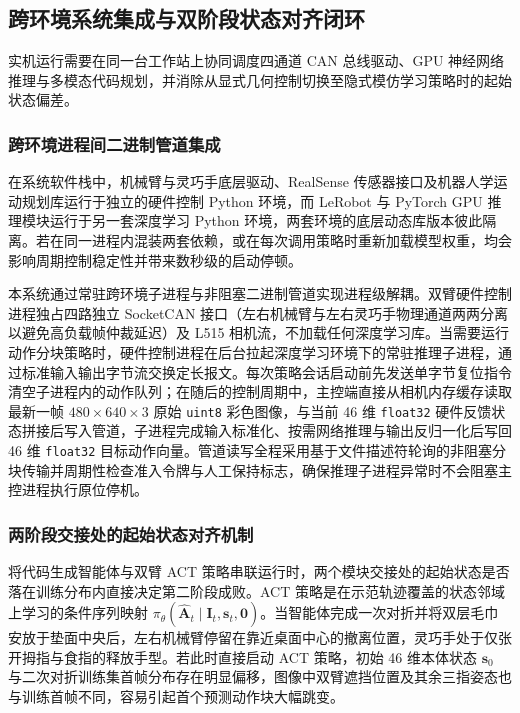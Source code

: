 \subsection{跨环境系统集成与双阶段状态对齐闭环}
\label{subsec:integration}

实机运行需要在同一台工作站上协同调度四通道 CAN 总线驱动、GPU 神经网络推理与多模态代码规划，并消除从显式几何控制切换至隐式模仿学习策略时的起始状态偏差。

\subsubsection{跨环境进程间二进制管道集成}

在系统软件栈中，机械臂与灵巧手底层驱动、RealSense 传感器接口及机器人学运动规划库运行于独立的硬件控制 Python 环境，而 LeRobot 与 PyTorch GPU 推理模块运行于另一套深度学习 Python 环境，两套环境的底层动态库版本彼此隔离。若在同一进程内混装两套依赖，或在每次调用策略时重新加载模型权重，均会影响周期控制稳定性并带来数秒级的启动停顿。

本系统通过常驻跨环境子进程与非阻塞二进制管道实现进程级解耦。双臂硬件控制进程独占四路独立 SocketCAN 接口（左右机械臂与左右灵巧手物理通道两两分离以避免高负载帧仲裁延迟）及 L515 相机流，不加载任何深度学习库。当需要运行动作分块策略时，硬件控制进程在后台拉起深度学习环境下的常驻推理子进程，通过标准输入输出字节流交换定长报文。每次策略会话启动前先发送单字节复位指令清空子进程内的动作队列；在随后的控制周期中，主控端直接从相机内存缓存读取最新一帧 $480\times 640\times 3$ 原始 \texttt{uint8} 彩色图像，与当前 46 维 \texttt{float32} 硬件反馈状态拼接后写入管道，子进程完成输入标准化、按需网络推理与输出反归一化后写回 46 维 \texttt{float32} 目标动作向量。管道读写全程采用基于文件描述符轮询的非阻塞分块传输并周期性检查准入令牌与人工保持标志，确保推理子进程异常时不会阻塞主控进程执行原位停机。

\subsubsection{两阶段交接处的起始状态对齐机制}

将代码生成智能体与双臂 ACT 策略串联运行时，两个模块交接处的起始状态是否落在训练分布内直接决定第二阶段成败。ACT 策略是在示范轨迹覆盖的状态邻域上学习的条件序列映射 $\pi_{\theta}(\hat{\bm{A}}_t \mid \bm{I}_t, \bm{s}_t, \bm{0})$。当智能体完成一次对折并将双层毛巾安放于垫面中央后，左右机械臂停留在靠近桌面中心的撤离位置，灵巧手处于仅张开拇指与食指的释放手型。若此时直接启动 ACT 策略，初始 46 维本体状态 $\bm{s}_0$ 与二次对折训练集首帧分布存在明显偏移，图像中双臂遮挡位置及其余三指姿态也与训练首帧不同，容易引起首个预测动作块大幅跳变。

